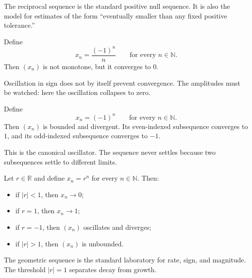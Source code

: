 \begin{remark*}[Interpretation]
The reciprocal sequence is the standard positive null sequence. It is also
the model for estimates of the form ``eventually smaller than any fixed
positive tolerance.''
\end{remark*}

\begin{example}
\label{ex:sequence-example-alternating-null}
Define
\[
  x_n=\frac{(-1)^n}{n}
  \qquad
  \text{for every } n\in\mathbb{N}.
\]
Then $(x_n)$ is not monotone, but it converges to $0$.
\end{example}

\begin{remark*}[Interpretation]
Oscillation in sign does not by itself prevent convergence. The amplitudes
must be watched: here the oscillation collapses to zero.
\end{remark*}

\begin{example}
\label{ex:sequence-example-oscillating}
Define
\[
  x_n=(-1)^n
  \qquad
  \text{for every } n\in\mathbb{N}.
\]
Then $(x_n)$ is bounded and divergent. Its even-indexed subsequence converges
to $1$, and its odd-indexed subsequence converges to $-1$.
\end{example}

\begin{remark*}[Interpretation]
This is the canonical oscillator. The sequence never settles because two
subsequences settle to different limits.
\end{remark*}

\begin{example}
\label{ex:sequence-example-geometric}
Let $r\in\mathbb{R}$ and define $x_n=r^n$ for every $n\in\mathbb{N}$.
Then:
\begin{itemize}
  \item if $|r|<1$, then $x_n\to 0$;
  \item if $r=1$, then $x_n\to 1$;
  \item if $r=-1$, then $(x_n)$ oscillates and diverges;
  \item if $|r|>1$, then $(x_n)$ is unbounded.
\end{itemize}
\end{example}

\begin{remark*}[Interpretation]
The geometric sequence is the standard laboratory for rate, sign, and
magnitude. The threshold $|r|=1$ separates decay from growth.
\end{remark*}

